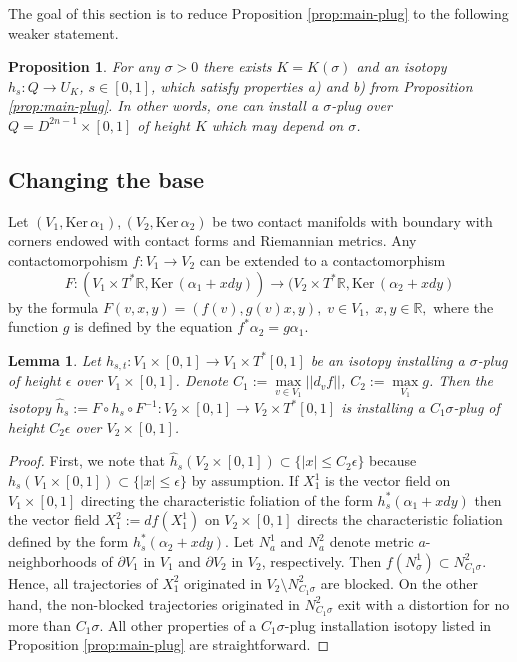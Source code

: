 \documentclass[12pt]{amsart}
\theoremstyle{plain}
\newtheorem{lemma}[theorem]{Lemma}
\newtheorem{prop}[theorem]{Proposition}
\theoremstyle{definition}
\theoremstyle{remark}
\newcommand{\R}{\mathbb{R}}
\newcommand{\eps}{\epsilon}
\newcommand{\p}{\partial}
\newcommand{\wh}{\widehat}
\newcommand{\Ker}{\mathrm{Ker\,}}
\begin{document}
 
  The goal of  this section  is to reduce  Proposition \ref{prop:main-plug}  to the following weaker statement.
 \begin{prop}\label{prop:main-plug-weak}
 For any $\sigma>0$  there exists  $K=K(\sigma)$ and an    isotopy
 $ h_{s}: Q\to  U_K$, $s\in [0,1]$, which satisfy properties a) and b) from Proposition \ref{prop:main-plug}.
 In other words, one can install a $\sigma$-plug over $Q=D^{2n-1}\times[0,1]$ of height $K$ which may depend on $\sigma$.
 \end{prop}
   \subsection{Changing the base} \label{sec:base}
 
 
 Let $(V_1,\Ker\alpha_1), (V_2,\Ker\alpha_2)$ be two  contact manifolds  with boundary with corners endowed with contact forms and Riemannian metrics.    
 Any contactomorpohism $f:V_1\to V_2$ can be extended to a contactomorphism $$F:(V_1\times T^*\R,\Ker(\alpha_1+xdy))\to (V_2\times T^*\R, \Ker(\alpha_2+xdy)$$    by the formula $F(v,x, y)=(f(v), g(v)x, y), \; v\in V_1,\; x,y\in\R,$ where the function $g$ is defined by the equation $f^*\alpha_2=g\alpha_1$. 
   \begin{lemma}\label{lm:sigma-distortion}
 Let $h_{s,t}:V_1\times[0,1]\to V_1\times T^*[0,1]$  be an isotopy installing a $\sigma$-plug  of height $\eps$ over $V_1\times[0,1]$. Denote $C_1:=\mathop{\max}\limits_{v\in V_1}||d_vf||$, $C_2:=\max\limits_{V_1} g$. Then the isotopy $\wh h_{s}:= F\circ h_{s}\circ F^{-1}:V_2\times[0,1]\to V_2\times T^*[0,1]$ is installing a $C_1\sigma$-plug  of height $C_2\eps$ over $V_2\times[0,1]$. 
 \end{lemma}
 \begin{proof} First, we note that  $\wh h_s(V_2\times[0,1])\subset \{|x|\leq C_2\eps\}$  because
  $h_s(V_1\times[0,1])\subset \{|x|\leq  \eps\}$ by assumption.  If $X_1^1$ is  the vector field on $V_1\times[0,1]$ directing the characteristic foliation
 of the form $h_s^*(\alpha_1+xdy)$ then  the vector field $X_1^2:=df(X_1^1)$   on $V_2\times[0,1]$ directs the characteristic foliation
defined by the form $h_s^*(\alpha_2+xdy)$.
 Let $N^1_a$ and $N^2_a$   denote   metric  $a$-neighborhoods    of  $\p V_1$ in $V_1$ and $\p V_2$ in $V_2$, respectively. Then $f(N^1_\sigma)\subset N^2_{C_1\sigma}$.  Hence, all trajectories of $X_1^2$ originated in $V_2\setminus  N^2_{C_1\sigma}$ are blocked. On the other hand, the non-blocked trajectories originated in $N^2_{C_1\sigma}$  exit with a distortion for no more than $C_1\sigma$. All other properties of a $C_1\sigma$-plug installation isotopy  listed in Proposition \ref{prop:main-plug} are straightforward. 
 \end{proof}
 
\end{document}
